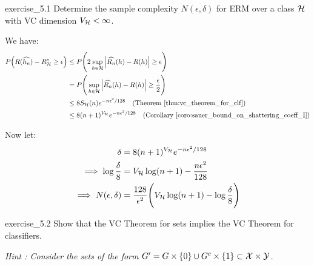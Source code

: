 \begin{exercise}{}{exercise_5.1}
    Determine the sample complexity $N(\epsilon, \delta)$ for ERM over a class $\mathcal{H}$ with VC dimension $V_{\mathcal{H}}<\infty$.
\end{exercise}

\begin{solution*}
    We have:
    \begin{align*}
        P\bigRound{R(\widehat{h_n}) - R_\Hf^* \ge \epsilon} 
        &\le P\biggRound{
            2\sup_{h\in\Hf}\bigAbs{ \widehat{R_n}(h) - R(h) } \ge \epsilon
        } \\
        &= P\biggRound{
            \sup_{h\in\Hf}\bigAbs{ \widehat{R_n}(h) - R(h) } \ge \frac{\epsilon}{2}
        } \\
        &\le 8S_\Hf(n)e^{-n\epsilon^2/128} \ \ \ (\text{Theorem } \ref{thm:vc_theorem_for_clf}) \\
        &\le 8(n+1)^{V_\Hf} e^{-n\epsilon^2/128} \ \ \ (\text{Corollary } \ref{coro:sauer_bound_on_shattering_coeff_I})
    \end{align*}

    \noindent Now let:
    \begin{align*}
        \delta &= 8(n+1)^{V_{\mathcal{H}}}e^{-n\epsilon^2/128} \\
        \implies
        \log\frac{\delta}{8} &= V_{\mathcal{H}}\log(n+1) - \frac{n\epsilon^2}{128}
        \\
        \implies
        N(\epsilon, \delta) &= \frac{128}{\epsilon^2} \Bigg( 
            V_{\mathcal{H}}\log (n+1) - \log\frac{\delta}{8}
         \Bigg)
    \end{align*}
\end{solution*}

\begin{exercise}{}{exercise_5.2}
    Show that the VC Theorem for sets implies the VC Theorem for classifiers. 

    \noindent\newline\textit{Hint : Consider the sets of the form $G'=G\times\{0\} \cup G^c \times \{1\} \subset \mathcal{X}\times\mathcal{Y}$.}
\end{exercise}


